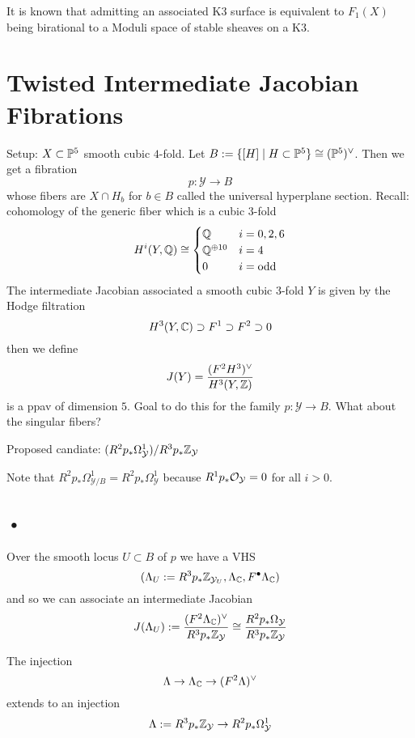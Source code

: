 \documentclass[12pt]{article}
\begin{document}
It is known that admitting an associated K3 surface is equivalent to $F_1(X)$ being birational to a Moduli space of stable sheaves on a K3. 

\section{Twisted Intermediate Jacobian Fibrations}

\newcommand{\cY}{\mathcal{Y}}

Setup: $X \subset \P^5$ smooth cubic $4$-fold. Let $B := \{ [H] \mid H \subset \P^5 \} \cong (\P^5)^\vee$. Then we get a fibration
\[ p : \cY \to B \]
whose fibers are $X \cap H_b$ for $b \in B$ called the universal hyperplane section. Recall: cohomology of the generic fiber which is a cubic $3$-fold
\[ H^i(Y, \Q) \cong \begin{cases}
\Q & i = 0,2,6
\\
\Q^{\oplus 10} & i = 4
\\
0 & i = \text{odd}
\end{cases} \]
The intermediate Jacobian associated a smooth cubic $3$-fold $Y$ is given by the Hodge filtration
\[ H^3(Y, \CC) \supset F^1 \supset F^2 \supset 0 \]
then we define
\[ J(Y) = \frac{(F^2 H^3)^\vee}{H^3(Y, \ZZ)} \]
is a ppav of dimension $5$. Goal to do this for the family $p : \cY \to B$. What about the singular fibers? 
\par 
Proposed candiate: $(R^2 p_* \Omega_{\cY}^1) / R^3 p_* \Z_{\cY}$

\begin{rmk}
Note that $R^2 p_* \Omega^1_{\cY/B} = R^2 p_* \Omega^1_{\cY}$ because $R^1 p_* \struct{\cY} = 0$ for all $i > 0$. 
\end{rmk} 

\subsection{•}

Over the smooth locus $U \subset B$ of $p$ we have a VHS 
\[ (\Lambda_U := R^3 p_* \Z_{\cY_U}, \Lambda_{\CC}, F^\bullet \Lambda_{\CC}) \]
and so we can associate an intermediate Jacobian
\[ J(\Lambda_U) := \frac{(F^2 \Lambda_{\CC})^\vee}{R^3 p_* \Z_{\cY}} \cong \frac{R^2 p_* \Omega_{\cY}}{R^3 p_* \Z_{\cY}} \]

\begin{prop}
The injection
\[ \Lambda \to \Lambda_{\CC} \to (F^2 \Lambda)^\vee \]
 extends to an injection
 \[ \Lambda := R^3 p_* \Z_{\cY} \to R^2 p_* \Omega^1_{\cY} \]
\end{prop}
\end{document}
